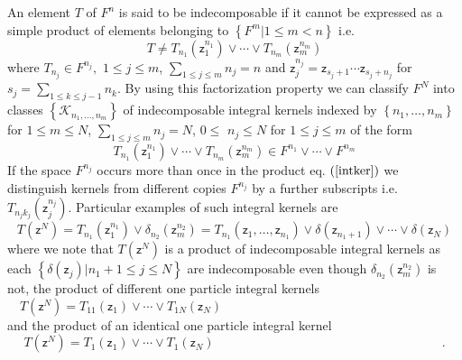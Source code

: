 \documentclass[aps,preprint]{revtex4}%
\begin{document}
An element $T$ of $F^{n}$ is said to be indecomposable if it cannot be
expressed as a simple product of elements belonging to $\left\{  F^{m}|1\leq
m<n\right\}  $ i.e.
\begin{equation}
T\neq T_{n_{1}}\left(  \mathsf{z}_{1}^{n_{1}}\right)  \vee\cdots\vee T_{n_{m}%
}\left(  \mathsf{z}_{m}^{n_{m}}\right)
\end{equation}
where $T_{n_{j}}\in F^{n_{j}},$ $1\leq j\leq m$, $%
{\textstyle\sum\limits_{1\leq j\leq m}}
n_{j}=n$ and $\mathsf{z}_{j}^{n_{j}}=\mathsf{z}_{s_{j}+1}\cdots\mathsf{z}%
_{s_{j}+n_{j}}$ for $s_{j}=%
{\textstyle\sum\limits_{1\leq k\leq j-1}}
n_{k}$. By using this factorization property we can classify $F^{N}$ into
classes $\left\{  \mathcal{K}_{n_{1},\ldots,n_{m}}\right\}  $ of
indecomposable integral kernels indexed by $\left\{  n_{1},\ldots
,n_{m}\right\}  $ for $1\leq m\leq N$, $%
{\textstyle\sum\limits_{1\leq j\leq m}}
n_{j}=N$, $0\leq$ $n_{j}\leq N$ for $1\leq j\leq m$ of the form
\begin{equation}
T_{n_{1}}\left(  \mathsf{z}_{1}^{n_{1}}\right)  \vee\cdots\vee T_{n_{m}%
}\left(  \mathsf{z}_{m}^{n_{m}}\right)  \in F^{n_{1}}\vee\cdots\vee F^{n_{m}}
\label{intker}%
\end{equation}
If the space $F^{n_{j}}$ occurs more than once in the product eq. $\left(
\ref{intker}\right)  $ we distinguish kernels from different copies $F^{n_{j}}
$ by a further subscripts i.e. $T_{n_{j}k_{j}}\left(  \mathsf{z}_{j}^{n_{j}%
}\right)  $. Particular examples of such integral kernels are
\begin{equation}
T\left(  \mathsf{z}^{N}\right)  =T_{n_{1}}\left(  \mathsf{z}_{1}^{n_{1}%
}\right)  \vee\delta_{n_{2}}\left(  \mathsf{z}_{m}^{n_{2}}\right)  =T_{n_{1}%
}\left(  \mathsf{z}_{1},\ldots,\mathsf{z}_{n_{1}}\right)  \vee\delta\left(
\mathsf{z}_{n_{1}+1}\right)  \vee\cdots\vee\delta\left(  \mathsf{z}%
_{N}\right)
\end{equation}
where we note that $T\left(  \mathsf{z}^{N}\right)  $ is a product of
indecomposable integral kernels as each $\left\{  \delta\left(  \mathsf{z}%
_{j}\right)  |n_{1}+1\leq j\leq N\right\}  $ are indecomposable even though
$\delta_{n_{2}}\left(  \mathsf{z}_{m}^{n_{2}}\right)  $ is not, the product of
different one particle integral kernels
\begin{equation}
T\left(  \mathsf{z}^{N}\right)  =T_{11}\left(  \mathsf{z}_{1}\right)
\vee\cdots\vee T_{1N}\left(  \mathsf{z}_{N}\right)  \qquad\qquad\qquad
\qquad\qquad\qquad\qquad\qquad\qquad
\end{equation}
and the product of an identical one particle integral kernel%
\begin{equation}
T\left(  \mathsf{z}^{N}\right)  =T_{1}\left(  \mathsf{z}_{1}\right)
\vee\cdots\vee T_{1}\left(  \mathsf{z}_{N}\right)  \qquad\qquad\qquad
\qquad\qquad\qquad\qquad\qquad\qquad.
\end{equation}
\end{document}
